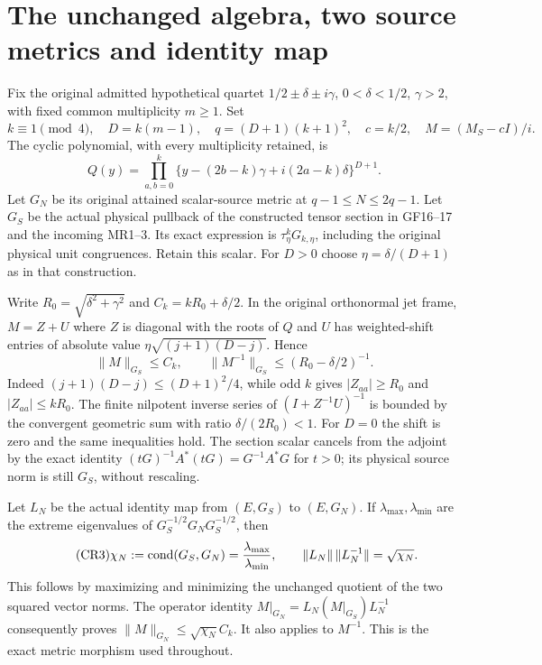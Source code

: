 \documentclass[11pt]{article}
\begin{document}
\section{The unchanged algebra, two source metrics and identity map}
Fix the original admitted hypothetical quartet
$1/2\pm\delta\pm i\gamma$, $0<\delta<1/2$, $\gamma>2$, with fixed
common multiplicity $m\ge1$. Set
\[
 k\equiv1\pmod4,\quad D=k(m-1),\quad
 q=(D+1)(k+1)^2,\quad c=k/2,\quad
 M=(M_S-cI)/i.
 \tag{CR1}
\]
The cyclic polynomial, with every multiplicity retained, is
\[
 Q(y)=\prod_{a,b=0}^k
 \{y-(2b-k)\gamma+i(2a-k)\delta\}^{D+1}.
\]
Let $G_N$ be its original attained scalar-source metric at
$q-1\le N\le2q-1$. Let $G_S$ be the actual physical pullback of
the constructed tensor section in GF16--17 \cite{CRGF} and the
incoming MR1--3. Its exact expression is $\tau_\eta^kG_{k,\eta}$,
including the original physical unit congruences. Retain this scalar.
For $D>0$ choose $\eta=\delta/(D+1)$ as in that construction.

Write $R_0=\sqrt{\delta^2+\gamma^2}$ and $C_k=kR_0+\delta/2$.
In the original orthonormal jet frame, $M=Z+U$ where $Z$ is diagonal
with the roots of $Q$ and $U$ has weighted-shift entries of absolute
value $\eta\sqrt{(j+1)(D-j)}$. Hence
\begin{equation}\tag{CR2}
 \|M\|_{G_S}\le C_k,\qquad
 \|M^{-1}\|_{G_S}\le(R_0-\delta/2)^{-1}.
\end{equation}
Indeed $(j+1)(D-j)\le(D+1)^2/4$, while odd $k$ gives
$|Z_{aa}|\ge R_0$ and $|Z_{aa}|\le kR_0$.
The finite nilpotent inverse series of $(I+Z^{-1}U)^{-1}$ is bounded
by the convergent geometric sum with ratio $\delta/(2R_0)<1$.
For $D=0$ the shift is zero and the same inequalities hold.
The section scalar cancels from the adjoint by the exact identity
$(tG)^{-1}A^*(tG)=G^{-1}A^*G$ for $t>0$; its physical source norm
is still $G_S$, without rescaling.

Let $L_N$ be the actual identity map from $(E,G_S)$ to $(E,G_N)$.
If $\lambda_{\max},\lambda_{\min}$ are the extreme eigenvalues of
$G_S^{-1/2}G_NG_S^{-1/2}$, then
\begin{equation}\tag{CR3}
 \chi_N:=\operatorname{cond}(G_S,G_N)=\frac{\lambda_{\max}}{\lambda_{\min}},
 \qquad \|L_N\|\,\|L_N^{-1}\|=\sqrt{\chi_N}.
\end{equation}
This follows by maximizing and minimizing the unchanged quotient of
the two squared vector norms. The operator identity
$M|_{G_N}=L_N(M|_{G_S})L_N^{-1}$ consequently proves
$\|M\|_{G_N}\le\sqrt{\chi_N}C_k$. It also applies to $M^{-1}$.
This is the exact metric morphism used throughout.
\end{document}
